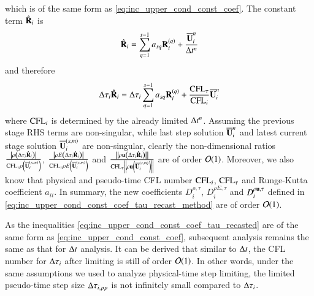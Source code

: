 which is of the same form as \eqref{eq:inc_upper_cond_const_coef}.
The constant term  $\hat{\mathbf{R}}_i$ is
\begin{equation}
        \hat{\mathbf{R}}_i  = \sum_{q=1}^{s-1} a_{sq} \mathbf{R}_i^{\left(q\right)} +
    \dfrac{\overline{\mathbf{U}}_i^{n}}{\mathrm\Delta t^n} 
\end{equation}
and therefore
\begin{equation}
        \mathrm\Delta\tau_i\hat{\mathbf{R}}_i  = \mathrm\Delta\tau_i\sum_{q=1}^{s-1} a_{sq} \mathbf{R}_i^{\left(q\right)} +
    \dfrac{\text{CFL}_\tau}{\text{CFL}_i}\overline{\mathbf{U}}_i^{n} 
\end{equation}
where $\text{CFL}_i$ is determined by the already limited $\mathrm\Delta t^n$.
Assuming the previous stage RHS terms are non-singular, while 
last step solution $\overline{\mathbf{U}}_i^n$ and 
latest current stage solution $\overline{\mathbf{U}}_i^{\left(s,m\right)}$ are non-singular, clearly the 
non-dimensional ratios 
$\frac{\left| \rho\left(\mathrm\Delta\tau_i \hat{\mathbf{R}}_i\right) \right|}
{ \text{CFL}_\tau\rho\left( \overline{\mathbf{U}}_i^{\left(s,m\right)} \right)}$,
$\frac{\left| \rho E\left(\mathrm\Delta\tau_i \hat{\mathbf{R}}_i\right) \right|}
{ \text{CFL}_\tau\rho E\left( \overline{\mathbf{U}}_i^{\left(s,m\right)} \right)}$ and 
$\frac{\left\|\rho\mathbf{u}\left(\mathrm\Delta\tau_i \hat{\mathbf{R}}_i\right) \right\|}
{ \text{CFL}_\tau\left\|\rho \mathbf{u}\left( \overline{\mathbf{U}}_i^{\left(s,m\right)} \right)\right\|}$
are of order $\mathcal{O}(1)$. 
Moreover, we also know that physical and pseudo-time CFL number $\text{CFL}_i$, $\text{CFL}_\tau$ and 
Runge-Kutta coefficient $a_{ii}$.
In summary, the new coefficients $D^{\rho,\tau}_i$, $D^{\rho E,\tau}_i$ 
and $D^{\rho \mathbf{u},\tau}_i$ defined in \eqref{eq:inc_upper_cond_const_coef_tau_recast_method}
are of order $\mathcal{O}(1)$. 

As the inequalities \eqref{eq:inc_upper_cond_const_coef_tau_recasted}
are of the same form as \eqref{eq:inc_upper_cond_const_coef}, 
subsequent analysis remains the same as that for $\mathrm\Delta t$ analysis. 
It can be derived that similar to $\mathrm\Delta t$, the CFL number 
for $\mathrm\Delta \tau _i$ after limiting is still of order $\mathcal{O}(1)$.
In other words,
under the same assumptions we used to analyze physical-time step limiting,
the limited pseudo-time step size $\mathrm\Delta \tau_{i,pp}$ is not infinitely small compared to $\mathrm\Delta \tau_i$.


